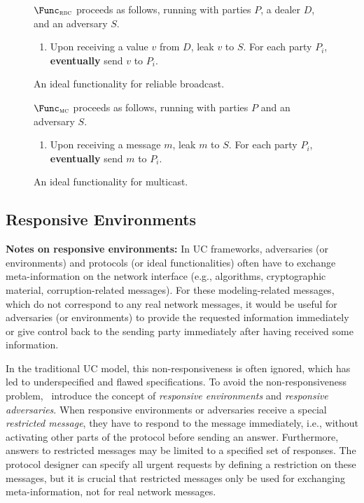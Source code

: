 \begin{figure}
\begin{func}
    $\Func_{\textsc{rbc}}$ proceeds as follows, running with parties $P$, a
  dealer $D$, and an adversary $S$.
    \begin{enumerate}
      \item Upon receiving a value $v$ from $D$, leak $v$ to $S$. For each party
        $P_i$, \textbf{eventually} send $v$ to $P_i$.
    \end{enumerate}
\end{func}
\caption{An ideal functionality for reliable broadcast.}
\label{func:rbc}
\end{figure}

\begin{figure}
\begin{func}
    $\Func_{\textsc{mc}}$ proceeds as follows, running with parties $P$ and an
  adversary $S$.
    \begin{enumerate}
      \item Upon receiving a message $m$, leak $m$ to $S$. For each party
        $P_i$, \textbf{eventually} send $m$ to $P_i$.
    \end{enumerate}
\end{func}
\caption{An ideal functionality for multicast.}
\label{func:mc}
\end{figure}

\subsection{Responsive Environments}
\label{subsec:responsive}
\todo{}
\textbf{Notes on responsive environments:} In UC frameworks, adversaries
(or environments) and protocols (or ideal functionalities) often have to
exchange meta-information on the network interface (e.g., algorithms,
cryptographic material, corruption-related messages). For these
modeling-related messages, which do not correspond to any real network messages,
it would be useful for adversaries (or environments) to provide the requested
information immediately or give control back to the sending party immediately
after having received some information.

In the traditional UC model, this non-responsiveness is often ignored, which has
led to underspecified and flawed specifications. To avoid the non-responsiveness
problem,~\cite{camenisch2016universal} introduce the concept of \emph{responsive
  environments} and \emph{responsive adversaries}. When responsive environments
or adversaries receive a special \emph{restricted message}, they have to respond
to the message immediately, i.e., without activating other parts of the protocol
before sending an answer. Furthermore, answers to restricted messages may be
limited to a specified set of responses. The protocol designer can specify all
urgent requests by defining a restriction on these messages, but it is crucial
that restricted messages only be used for exchanging meta-information, not for
real network messages.

